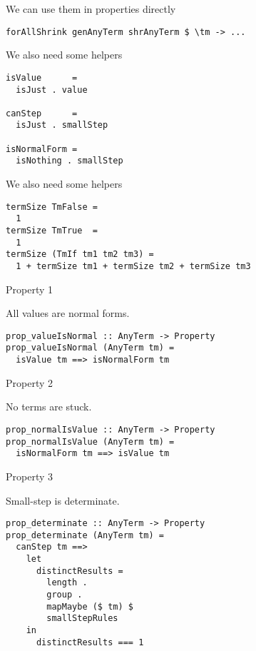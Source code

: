 \documentclass[aspectration=169]{beamer}
\begin{document}
\begin{frame}[fragile]
  \begin{center}
  We can use them in properties directly
  \end{center}
  \begin{verbatim}
forAllShrink genAnyTerm shrAnyTerm $ \tm -> ...
  \end{verbatim}
\end{frame}

\begin{frame}[fragile]
  We also need some helpers
  \begin{verbatim}
isValue      = 
  isJust . value

canStep      =
  isJust . smallStep

isNormalForm = 
  isNothing . smallStep
  \end{verbatim}
\end{frame}

\begin{frame}[fragile]
  We also need some helpers
  \begin{verbatim}
termSize TmFalse = 
  1
termSize TmTrue  =
  1
termSize (TmIf tm1 tm2 tm3) = 
  1 + termSize tm1 + termSize tm2 + termSize tm3
  \end{verbatim}
\end{frame}

\begin{frame}[fragile]
  Property 1
  \begin{center}
All values are normal forms.
  \end{center}
  \begin{verbatim}
prop_valueIsNormal :: AnyTerm -> Property
prop_valueIsNormal (AnyTerm tm) =
  isValue tm ==> isNormalForm tm
  \end{verbatim}
\end{frame}

\begin{frame}[fragile]
  Property 2
  \begin{center}
No terms are stuck.
  \end{center}
  \begin{verbatim}
prop_normalIsValue :: AnyTerm -> Property
prop_normalIsValue (AnyTerm tm) =
  isNormalForm tm ==> isValue tm
  \end{verbatim}
\end{frame}

\begin{frame}[fragile]
  Property 3
  \begin{center}
Small-step is determinate.
  \end{center}
  \begin{verbatim}
prop_determinate :: AnyTerm -> Property
prop_determinate (AnyTerm tm) =
  canStep tm ==>
    let
      distinctResults =
        length .
        group .
        mapMaybe ($ tm) $
        smallStepRules
    in
      distinctResults === 1
  \end{verbatim}
\end{frame}
\end{document}
